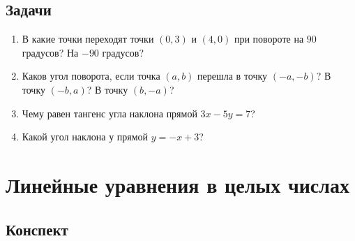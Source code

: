 \subsection*{Задачи}

\begin{enumerate}
\item В какие точки переходят точки $(0,3)$ и $(4,0)$ при повороте на $90$ градусов? На $-90$ градусов?
\item Каков угол поворота, если точка $(a,b)$ перешла в точку $(-a,-b)$? В точку $(-b,a)$? В точку $(b,-a)$?
\item Чему равен тангенс угла наклона прямой $3x-5y=7$?
\item Какой угол наклона у прямой $y=-x+3$?
\end{enumerate}


\section{Линейные уравнения в целых числах}

\subsection*{Конспект}

